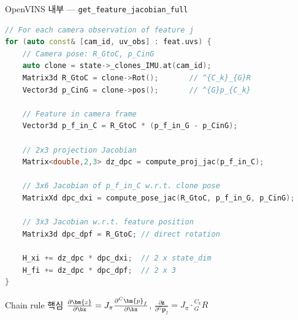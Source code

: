 \begin{frame}[fragile,shrink=10]{OpenVINS 내부 — \texttt{get\_feature\_jacobian\_full}}
\begin{lstlisting}[language=C++]
// For each camera observation of feature j
for (auto const& [cam_id, uv_obs] : feat.uvs) {
    // Camera pose: R_GtoC, p_CinG
    auto clone = state->_clones_IMU.at(cam_id);
    Matrix3d R_GtoC = clone->Rot();       // ^{C_k}_{G}R
    Vector3d p_CinG = clone->pos();       // ^{G}p_{C_k}

    // Feature in camera frame
    Vector3d p_f_in_C = R_GtoC * (p_f_in_G - p_CinG);

    // 2x3 projection Jacobian
    Matrix<double,2,3> dz_dpc = compute_proj_jac(p_f_in_C);

    // 3x6 Jacobian of p_f_in_C w.r.t. clone pose
    MatrixXd dpc_dxi = compute_pose_jac(R_GtoC, p_f_in_G, p_CinG);

    // 3x3 Jacobian w.r.t. feature position
    Matrix3d dpc_dpf = R_GtoC; // direct rotation

    H_xi += dz_dpc * dpc_dxi;  // 2 x state_dim
    H_fi += dz_dpc * dpc_dpf;  // 2 x 3
}
\end{lstlisting}
  \begin{alertblock}{Chain rule 핵심}
    $\frac{\partial \bm{z}}{\partial \bx} = J_\pi \frac{\partial {}^C\bm{p}_f}{\partial \bx}$,\quad
    $\frac{\partial \bm{z}}{\partial {}^G\bm{p}_f} = J_\pi \cdot {}^{C_k}_G R$
  \end{alertblock}
\end{frame}

